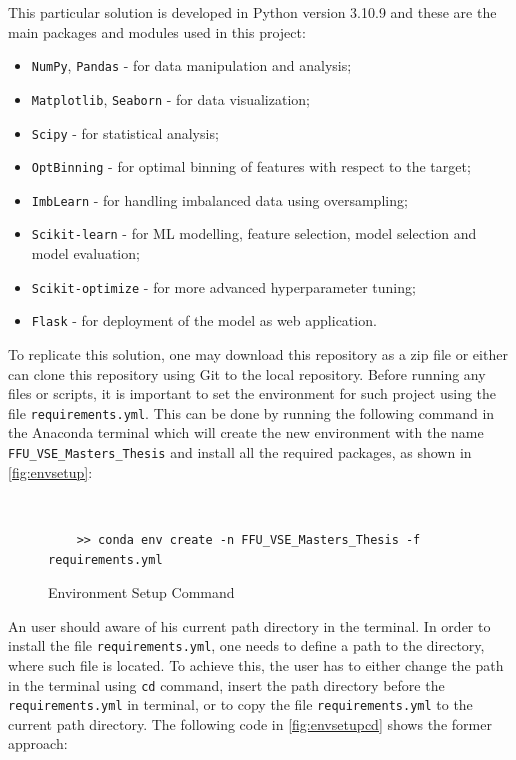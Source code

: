 This particular solution is developed in Python version 3.10.9 and these are the main packages and modules used in this project:
\begin{itemize}\setlength\itemsep{0em}
\item \lstinline{NumPy}, \lstinline{Pandas} - for data manipulation and analysis;
\item \lstinline{Matplotlib}, \lstinline{Seaborn} - for data visualization;
\item \lstinline{Scipy} - for statistical analysis;
\item \lstinline{OptBinning} - for optimal binning of features with respect to the target;
\item \lstinline{ImbLearn} - for handling imbalanced data using oversampling;
\item \lstinline{Scikit-learn} - for ML modelling, feature selection, model selection and model evaluation;
\item \lstinline{Scikit-optimize} - for more advanced hyperparameter tuning;
\item \lstinline{Flask} - for deployment of the model as web application.
\end{itemize}
\newpage
To replicate this solution, one may download this repository as a zip file or either can clone this repository using Git to the local repository. Before running any files or scripts, it is important to set the environment for such project using the file \texttt{requirements.yml}.
This can be done by running the following command in the Anaconda terminal which will create the new environment with the name \texttt{FFU\_VSE\_Masters\_Thesis} and install all the required packages, as shown in \autoref{fig:envsetup}:
\begin{figure}[H]
    \centering\caption{Environment Setup Command}
    \label{fig:envsetup}
\centering\
{\footnotesize
\begin{verbatim}
    >> conda env create -n FFU_VSE_Masters_Thesis -f requirements.yml    
\end{verbatim}
}
\vspace{0em}
\end{figure}
An user should aware of his current path directory in the terminal. In order to install the file \texttt{requirements.yml}, one needs to define a path to the directory, where such file is located.
To achieve this, the user has to either change the path in the terminal using \texttt{cd} command, insert the path directory before the \texttt{requirements.yml} in terminal, or to copy the file \texttt{requirements.yml} to the current path directory. The following code in \autoref{fig:envsetupcd} shows the former approach:
